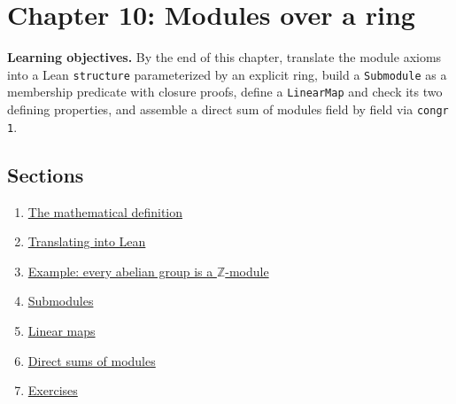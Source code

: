 \chapter{Chapter 10: Modules over a ring}\label{sec:10-modules:00-index:1}

\textbf{Learning objectives.} By the end of this chapter, translate the module axioms into a Lean \texttt{structure} parameterized by an explicit ring, build a \texttt{Submodule} as a membership predicate with closure proofs, define a \texttt{LinearMap} and check its two defining properties, and assemble a direct sum of modules field by field via \texttt{congr 1}.

\section{Sections}\label{sec:10-modules:00-index:2}

\begin{enumerate}
\def\labelenumi{\arabic{enumi}.}
\tightlist
\item
  \hyperref[sec:10-modules:01-definition:1]{The mathematical definition}
\item
  \hyperref[sec:10-modules:02-translating-into-lean:1]{Translating into Lean}
\item
  \hyperref[sec:10-modules:03-z-module-example:1]{Example: every abelian group is a \(\mathbb{Z}\)-module}
\item
  \hyperref[sec:10-modules:04-submodules:1]{Submodules}
\item
  \hyperref[sec:10-modules:05-linear-maps:1]{Linear maps}
\item
  \hyperref[sec:10-modules:06-direct-sums:1]{Direct sums of modules}
\item
  \hyperref[sec:10-modules:07-exercises:1]{Exercises}
\end{enumerate}








